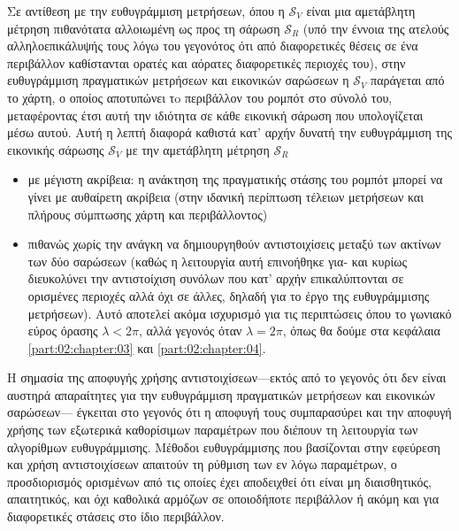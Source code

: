 \begin{gg_box}
\begin{remark}
Σε αντίθεση με την ευθυγράμμιση μετρήσεων, όπου η $\mathcal{S}_V$ είναι μια
αμετάβλητη μέτρηση πιθανότατα αλλοιωμένη ως προς τη σάρωση $\mathcal{S}_R$
(υπό την έννοια της ατελούς αλληλοεπικάλυψής τους λόγω του γεγονότος ότι από
διαφορετικές θέσεις σε ένα περιβάλλον καθίστανται ορατές και αόρατες
διαφορετικές περιοχές του), στην ευθυγράμμιση πραγματικών μετρήσεων και
εικονικών σαρώσεων η $\mathcal{S}_V$ παράγεται από το χάρτη, ο οποίος
αποτυπώνει τo περιβάλλον του ρομπότ στο σύνολό του, μεταφέροντας έτσι αυτή
την ιδιότητα σε κάθε εικονική σάρωση που υπολογίζεται μέσω αυτού. Αυτή η
λεπτή διαφορά καθιστά κατ' αρχήν δυνατή την ευθυγράμμιση της εικονικής
σάρωσης $\mathcal{S}_V$ με την αμετάβλητη μέτρηση $\mathcal{S}_R$
\begin{itemize}
  \item με μέγιστη ακρίβεια: η ανάκτηση της πραγματικής στάσης του ρομπότ
        μπορεί να γίνει με αυθαίρετη ακρίβεια (στην ιδανική περίπτωση τέλειων
        μετρήσεων και πλήρους σύμπτωσης χάρτη και περιβάλλοντος)
  \item πιθανώς χωρίς την ανάγκη να δημιουργηθούν αντιστοιχίσεις μεταξύ των
        ακτίνων των δύο σαρώσεων (καθώς η λειτουργία αυτή επινοήθηκε για- και
        κυρίως διευκολύνει την αντιστοίχιση συνόλων που κατ' αρχήν
        επικαλύπτονται σε ορισμένες περιοχές αλλά όχι σε άλλες, δηλαδή για το
        έργο της ευθυγράμμισης μετρήσεων). Aυτό αποτελεί ακόμα ισχυρισμό
        για τις περιπτώσεις όπου το γωνιακό εύρος όρασης $\lambda < 2\pi$, αλλά
        γεγονός όταν $\lambda = 2\pi$, όπως θα δούμε στα κεφάλαια
        \ref{part:02:chapter:03} και \ref{part:02:chapter:04}.
\end{itemize}

Η σημασία της αποφυγής χρήσης αντιστοιχίσεων---εκτός από το γεγονός ότι δεν είναι
αυστηρά απαραίτητες για την ευθυγράμμιση πραγματικών μετρήσεων και εικονικών
σαρώσεων--- έγκειται στο γεγονός ότι η αποφυγή τους συμπαρασύρει και την
αποφυγή χρήσης των εξωτερικά καθορίσιμων παραμέτρων που διέπουν τη λειτουργία των
αλγορίθμων ευθυγράμμισης. Μέθοδοι ευθυγράμμισης που βασίζονται στην εφεύρεση
και χρήση αντιστοιχίσεων απαιτούν τη ρύθμιση των εν λόγω παραμέτρων, ο
προσδιορισμός ορισμένων από τις οποίες έχει αποδειχθεί ότι είναι μη
διαισθητικός, απαιτητικός, και όχι καθολικά αρμόζων σε οποιοδήποτε
περιβάλλον ή ακόμη και για διαφορετικές στάσεις στο ίδιο περιβάλλον.
\end{remark}
\end{gg_box}


